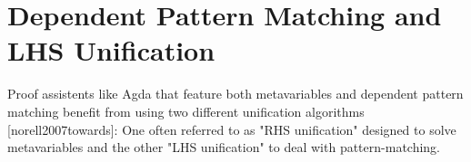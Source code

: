 \documentclass[
    a4paper, %
    fontsize=11pt, %
    twoside=false, %
	numbers=noenddot, %
	fontmethod=tex, %
]{kaobook}
\begin{document}





\section{Dependent Pattern Matching and LHS Unification}

Proof assistents like Agda that feature both metavariables and dependent pattern
matching benefit from using two different unification algorithms 
[norell2007towards]: One often referred to as "RHS unification" 
designed to solve metavariables and the other "LHS unification" to deal with
pattern-matching.
\end{document}
